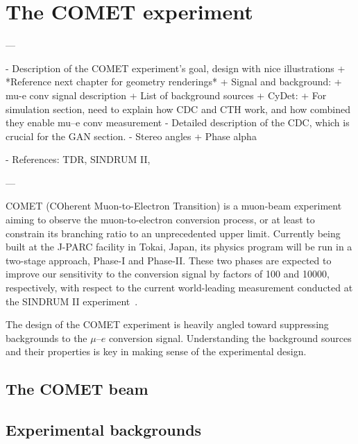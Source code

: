 \chapter{The COMET experiment}\label{chapter2}

\begin{markdown}
---

- Description of the COMET experiment's goal, design with nice illustrations
    + *Reference next chapter for geometry renderings*
    + Signal and background:
        + mu-e conv signal description
        + List of background sources
+ CyDet:
    + For simulation section, need to explain how CDC and CTH work, and how combined they enable mu--e conv measurement
    - Detailed description of the CDC, which is crucial for the GAN section.
     - Stereo angles
+ Phase alpha

- References: TDR, SINDRUM II, 

---
\end{markdown}

COMET (COherent Muon-to-Electron Transition) is a muon-beam experiment aiming to
observe the muon-to-electron conversion process, or at least to constrain its
branching ratio to an unprecedented upper limit. Currently being built at the
J-PARC facility in Tokai, Japan, its physics program will be run in a two-stage
approach, Phase-I and Phase-II. These two phases are expected to improve our
sensitivity to the conversion signal by factors of 100 and \num{10000},
respectively, with respect to the current world-leading measurement conducted at
the SINDRUM II experiment~\cite{Bertl:2006up}.




The design of the COMET experiment is heavily angled toward suppressing
backgrounds to the $\mu$--$e$ conversion signal. Understanding the background
sources and their properties is key in making sense of the experimental design.

\section{The COMET beam}\label{sec:COMET_beam}

\section{Experimental backgrounds}\label{sec:backgrounds}